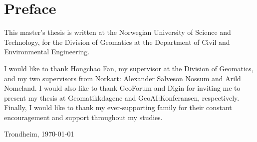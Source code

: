 \section*{Preface}

\begin{comment}
The Preface includes the facts: what type of project, where it is conducted,
who supervised, and any acknowledgements you wish to give.

This Master's Thesis template was created by Bj\"orn Gamb\"ack and is based on a template that he created for the 2016 ``Experts in Team'' course on
Computational Creativity (TDT4853) at the Norwegian University of Science and Technology (NTNU),
which in turn was heavily based on the 2014 AI Master's Thesis template created by Anders Kofod-Petersen ---
with some of the explaining text stemming from Anders' original template.

You may basically thank anybody you like (and avoid thanking anybody you do not like) and in any form you like.
However, it is a good idea to always thank people who made direct contributions, e.g., those whose data you have been given access to or those whose images you have been given permission to reproduce.

Some students choose to include the text of the original project description in the Preface. This is possible but not necessary,
in particular not if you have changed the theme somewhat over time.
The Preface of the Master's Thesis might also be a good place to introduce your Specialisation Project, in case you plan
on reusing some texts from it (since the Specialisation Project is not a published and easily accessible work, and might
not be known to your audience, neither your text in itself nor even the general concept as such).
\end{comment}

This master's thesis is written at the Norwegian University of Science and Technology, for the Division of Geomatics at the Department of Civil and Environmental Engineering.

\vspace{6pt}

\noindent I would like to thank Hongchao Fan, my supervisor at the Division of Geomatics, and my two supervisors from Norkart: Alexander Salveson Nossum and Arild Nomeland. I would also like to thank GeoForum and Digin for inviting me to present my thesis at Geomatikkdagene and GeoAI:Konferansen, respectively. Finally, I would like to thank my ever-supporting family for their constant encouragement and support throughout my studies.

\vfill

\hfill \thesisAuthor

\hfill Trondheim, \today
